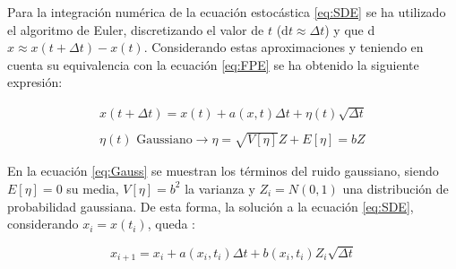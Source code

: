 Para la integraci\'on num\'erica de la ecuaci\'on estoc\'astica \ref{eq:SDE} se ha utilizado el algoritmo de Euler, discretizando el valor de $t$ (d$t \approx \Delta t$) y que d$x \approx x(t+\Delta t) - x(t)$. Considerando estas aproximaciones y teniendo en cuenta su equivalencia con la ecuaci\'on \ref{eq:FPE} se ha obtenido la siguiente expresi\'on:

	\begin{equation}
		\begin{matrix}
		x(t+\Delta t) = x(t) + a(x, t)\Delta t + \eta(t)\sqrt{\Delta t} \\ \\
		\eta(t) \textrm{ Gaussiano} \rightarrow \eta = \sqrt{V[\eta]} Z + E[\eta] = bZ
		\end{matrix}
		\label{eq:Gauss}
	\end{equation}

En la ecuaci\'on \ref{eq:Gauss} se muestran los t\'erminos del ruido gaussiano, siendo $E[\eta] = 0$ su media, $V[\eta] = b^2$ la varianza y $Z_i = N(0, 1)$ una distribuci\'on de probabilidad gaussiana. De esta forma, la soluci\'on a la ecuaci\'on \ref{eq:SDE}, considerando $x_i = x(t_i)$, queda \cite{gardiner1985handbook}:

	\begin{equation}
		x_{i+1} = x_i + a(x_i, t_i)\Delta t + b(x_i, t_i) Z_i\sqrt{\Delta t}
	\end{equation}
